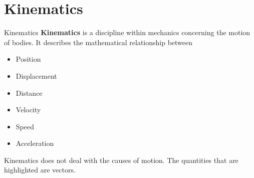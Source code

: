 \documentclass[12pt,compress,aspectratio=169,dvipsnames]{beamer}
\begin{document}

\section{Kinematics}

\begin{frame}{Kinematics}
  \textbf{Kinematics} is a discipline within mechanics concerning the
  motion of bodies. It describes the mathematical relationship between 
  \begin{itemize}
  \item<alert@1> Position
  \item<alert@1> Displacement
  \item Distance 
  \item<alert@1> Velocity
  \item Speed
  \item<alert@1> Acceleration
  \end{itemize}
  Kinematics does not deal with the causes of motion. The quantities that are
  highlighted are vectors.
\end{frame}
\end{document}
